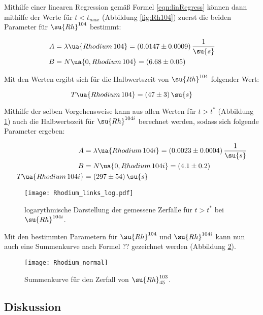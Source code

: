 Mithilfe einer linearen Regression gemäß Formel \eqref{eqn:linRegress} können
dann mithilfe der Werte für $t < t_{max}$ (Abbildung \ref{fig:Rh104}) zuerst die beiden Parameter
für $\su{Rh}^{104}$ bestimmt:

\begin{align*}
  A &= \lambda\ua{Rhodium\,104} = (0.0147 \pm 0.0009) \, \frac{1}{\su{s}}\\
  B &= N\ua{0,Rhodium\,104}     = (6.68 \pm 0.05)
\end{align*}

Mit den Werten ergibt sich für die Halbwertszeit von $\su{Rh}^{104}$ folgender
Wert:

\begin{equation*}
  T\ua{Rhodium\,104} = (47 \pm 3) \, \su{s}
\end{equation*}

Mithilfe der selben Vorgehensweise kann aus allen Werten für $t > t^{*}$ (Abbildung
\ref{fig:Rh104i}) auch die Halbwertszeit für $\su{Rh}^{104i}$ berechnet werden,
sodass sich folgende Parameter ergeben:

\begin{align*}
  A                  &= \lambda\ua{Rhodium\,104i} = (0.0023 \pm 0.0004) \, \frac{1}{\su{s}}\\
  B                  &= N\ua{0,Rhodium\,104i}     = (4.1 \pm 0.2) \\
  T\ua{Rhodium\,104i} &= (297 \pm 54) \, \su{s}
\end{align*}

\begin{figure}
  \texttt{[image: Rhodium\_links\_log.pdf]}
  \caption{logarythmische Darstellung der gemessene Zerfälle für $t > t^{*}$ bei $\su{Rh}^{104i}$.}
  \label{fig:Rh104i}
\end{figure}

Mit den bestimmten Parametern für $\su{Rh}^{104}$ und $\su{Rh}^{104i}$ kann nun
auch eine Summenkurve nach Formel ?? gezeichnet werden (Abbildung \ref{fig:Summe}).

\begin{figure}
  \texttt{[image: Rhodium\_normal]}
  \caption{Summenkurve für den Zerfall von $\su{Rh}_{45}^{103}$.}
  \label{fig:Summe}
\end{figure}

\newpage

\subsection{Diskussion}

